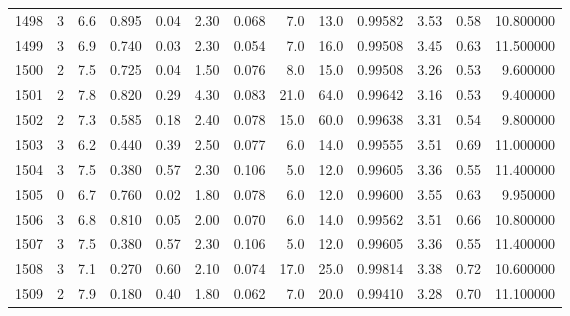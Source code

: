 \begin{tabular}{lrrrrrrrrrrrr}
1498 &        3 &            6.6 &             0.895 &         0.04 &            2.30 &      0.068 &                  7.0 &                  13.0 &  0.99582 &  3.53 &       0.58 &  10.800000 \\
1499 &        3 &            6.9 &             0.740 &         0.03 &            2.30 &      0.054 &                  7.0 &                  16.0 &  0.99508 &  3.45 &       0.63 &  11.500000 \\
1500 &        2 &            7.5 &             0.725 &         0.04 &            1.50 &      0.076 &                  8.0 &                  15.0 &  0.99508 &  3.26 &       0.53 &   9.600000 \\
1501 &        2 &            7.8 &             0.820 &         0.29 &            4.30 &      0.083 &                 21.0 &                  64.0 &  0.99642 &  3.16 &       0.53 &   9.400000 \\
1502 &        2 &            7.3 &             0.585 &         0.18 &            2.40 &      0.078 &                 15.0 &                  60.0 &  0.99638 &  3.31 &       0.54 &   9.800000 \\
1503 &        3 &            6.2 &             0.440 &         0.39 &            2.50 &      0.077 &                  6.0 &                  14.0 &  0.99555 &  3.51 &       0.69 &  11.000000 \\
1504 &        3 &            7.5 &             0.380 &         0.57 &            2.30 &      0.106 &                  5.0 &                  12.0 &  0.99605 &  3.36 &       0.55 &  11.400000 \\
1505 &        0 &            6.7 &             0.760 &         0.02 &            1.80 &      0.078 &                  6.0 &                  12.0 &  0.99600 &  3.55 &       0.63 &   9.950000 \\
1506 &        3 &            6.8 &             0.810 &         0.05 &            2.00 &      0.070 &                  6.0 &                  14.0 &  0.99562 &  3.51 &       0.66 &  10.800000 \\
1507 &        3 &            7.5 &             0.380 &         0.57 &            2.30 &      0.106 &                  5.0 &                  12.0 &  0.99605 &  3.36 &       0.55 &  11.400000 \\
1508 &        3 &            7.1 &             0.270 &         0.60 &            2.10 &      0.074 &                 17.0 &                  25.0 &  0.99814 &  3.38 &       0.72 &  10.600000 \\
1509 &        2 &            7.9 &             0.180 &         0.40 &            1.80 &      0.062 &                  7.0 &                  20.0 &  0.99410 &  3.28 &       0.70 &  11.100000 \\

\end{tabular}
